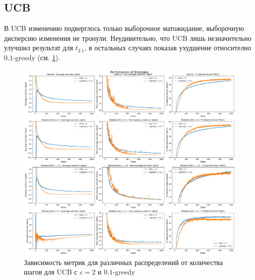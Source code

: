\documentclass{article}
\begin{document}
\subsection{UCB}

В UCB изменению подверглось только выборочное матожидание, выборочную дисперсию изменения не тронули. Неудивительно, что UCB лишь незначительно улучшил результат для $t_{2.1}$, в остальных случаях показав ухудшение относително $0.1$-greedy (см. \ref{fig:ucb_compare_ucb_and_eps_greedy}).

\begin{figure}[ht!] %
\centering
\includegraphics[width=6in]{theory_tester/theory_images/UCB/compare_ucb_and_eps_greedy.png}
\caption{Зависимость метрик для различных распределений от количества шагов для UCB с $c=2$ и $0.1$-greedy}
\label{fig:ucb_compare_ucb_and_eps_greedy}
\end{figure}
\end{document}
